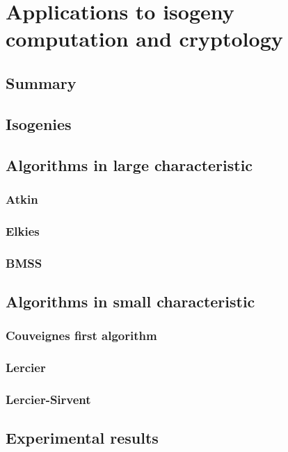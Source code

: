 \part{Applications to isogeny computation and cryptology}

\chapter{Summary}


\chapter{Isogenies}


\chapter{Algorithms in large characteristic}
\section{Atkin}
\section{Elkies}
\section{BMSS}

\chapter{Algorithms in small characteristic}

\section{Couveignes first algorithm}
\section{Lercier}
\section{Lercier-Sirvent}






\chapter{Experimental results}




%

